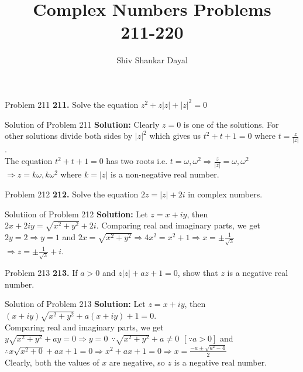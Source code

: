 \documentclass[aspectratio=169,8pt]{beamer}
\title{Complex Numbers Problems\\ 211-220}
\author[Shiv Shankar Dayal]{Shiv Shankar Dayal}
\begin{document}
\begin{frame}
  \titlepage
\end{frame}
\begin{frame}{Problem 211}
  \textbf{211.} Solve the equation $z^2 + z|z| + |z|^2 = 0$
\end{frame}
\begin{frame}{Solution of Problem 211}
  \textbf{Solution:} Clearly $z = 0$ is one of the solutions. For other solutions divide both sides by $|z|^2$ which gives us $t^2
  + t + 1 = 0$ where $t = \frac{z}{|z|}$.
  \\\vspace*{0.2cm}
  The equation $t^2 + t + 1 = 0$ has two roots i.e. $t = \omega, \omega^2 \Rightarrow \frac{z}{|z|} = \omega, \omega^2$
  \\\vspace*{0.2cm}
  $\Rightarrow z = k\omega, k\omega^2$ where $k = |z|$ is a non-negative real number.
\end{frame}
\begin{frame}{Problem 212}
  \textbf{212.} Solve the equation $2z = |z| + 2i$ in complex numbers.
\end{frame}
\begin{frame}{Solutiion of Problem 212}
  \textbf{Solution:} Let $z = x + iy$, then $2x + 2iy = \sqrt{x^2 + y^2} + 2i$. Comparing real and imaginary parts, we get
  \\\vspace*{0.2cm}
  $2y = 2 \Rightarrow y = 1$ and $2x = \sqrt{x^2 + y^2} \Rightarrow 4x^2 = x^2 + 1 \Rightarrow x = \pm\frac{1}{\sqrt{3}}$
  \\\vspace*{0.2cm}
  $\Rightarrow z = \pm\frac{1}{\sqrt{3}} + i$.
\end{frame}
\begin{frame}{Problem 213}
  \textbf{213.} If $a > 0$ and $z|z| + az + 1 = 0$, show that $z$ is a negative real number.
\end{frame}
\begin{frame}{Solution of Problem 213}
  \textbf{Solution:} Let $z = x + iy$, then $(x + iy)\sqrt{x^2 + y^2} + a(x + iy) + 1 = 0$.
  \\\vspace*{0.2cm}
  Comparing real and imaginary parts, we get
  \\\vspace*{0.2cm}
  $y\sqrt{x^2 + y^2} + ay = 0 \Rightarrow y = 0~~\because \sqrt{x^2 + y^2} + a \neq 0~~[\because a > 0]$ and
  \\\vspace*{0.2cm}
  $\therefore x\sqrt{x^2 + 0} + ax + 1 = 0 \Rightarrow x^2 + ax + 1 = 0 \Rightarrow x = \frac{-a \pm\sqrt{a^2 - 4}}{2}$
  \\\vspace*{0.2cm}
  Clearly, both the values of $x$ are negative, so $z$ is a negative real number.
\end{frame}
\end{document}
